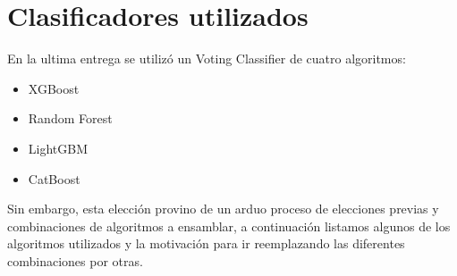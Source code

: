 \documentclass[a4paper ,12pt]{article}
\begin{document}
\newpage
\section{Clasificadores utilizados}

En la ultima entrega se utilizó un Voting Classifier de cuatro algoritmos:

\begin{itemize}
	
	\item XGBoost
	
	\item Random Forest 
	
	\item LightGBM
	
	\item CatBoost
	
\end{itemize}

Sin embargo, esta elección provino de un arduo proceso de elecciones previas y combinaciones de algoritmos a ensamblar, a continuación listamos algunos de los algoritmos utilizados y la motivación para ir reemplazando las diferentes combinaciones por otras.
\end{document}
